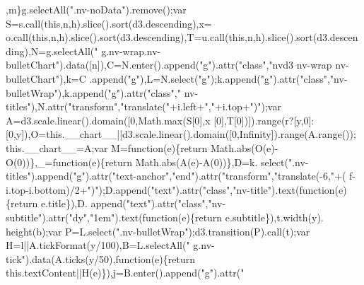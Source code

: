 \begin{DoxyCode}
      ,m\}g.selectAll(\textcolor{stringliteral}{".nv-noData"}).remove();var S=s.call(\textcolor{keyword}{this},n,h).slice().sort(d3.descending),x=
      o.call(\textcolor{keyword}{this},n,h).slice().sort(d3.descending),T=u.call(\textcolor{keyword}{this},n,h).slice().sort(d3.descending),N=g.selectAll(\textcolor{stringliteral}{"
      g.nv-wrap.nv-bulletChart"}).data([n]),C=N.enter().append(\textcolor{stringliteral}{"g"}).attr(\textcolor{stringliteral}{"class"},\textcolor{stringliteral}{"nvd3 nv-wrap nv-bulletChart"}),k=C
      .append(\textcolor{stringliteral}{"g"}),L=N.select(\textcolor{stringliteral}{"g"});k.append(\textcolor{stringliteral}{"g"}).attr(\textcolor{stringliteral}{"class"},\textcolor{stringliteral}{"nv-bulletWrap"}),k.append(\textcolor{stringliteral}{"g"}).attr(\textcolor{stringliteral}{"class"},\textcolor{stringliteral}{"
      nv-titles"}),N.attr(\textcolor{stringliteral}{"transform"},\textcolor{stringliteral}{"translate("}+i.left+\textcolor{stringliteral}{","}+i.top+\textcolor{stringliteral}{")"});var A=d3.scale.linear().domain([0,Math.max(S[0],x
      [0],T[0])]).range(r?[y,0]:[0,y]),O=this.\_\_chart\_\_||d3.scale.linear().domain([0,Infinity]).range(A.range());
      this.\_\_chart\_\_=A;var M=\textcolor{keyword}{function}(e)\{\textcolor{keywordflow}{return} Math.abs(O(e)-O(0))\},\_=\textcolor{keyword}{function}(e)\{\textcolor{keywordflow}{return} Math.abs(A(e)-A(0))\},D=k.
      select(\textcolor{stringliteral}{".nv-titles"}).append(\textcolor{stringliteral}{"g"}).attr(\textcolor{stringliteral}{"text-anchor"},\textcolor{stringliteral}{"end"}).attr(\textcolor{stringliteral}{"transform"},\textcolor{stringliteral}{"translate(-6,"}+(
      f-i.top-i.bottom)/2+\textcolor{stringliteral}{")"});D.append(\textcolor{stringliteral}{"text"}).attr(\textcolor{stringliteral}{"class"},\textcolor{stringliteral}{"nv-title"}).text(\textcolor{keyword}{function}(e)\{\textcolor{keywordflow}{return} e.title\}),D.
      append(\textcolor{stringliteral}{"text"}).attr(\textcolor{stringliteral}{"class"},\textcolor{stringliteral}{"nv-subtitle"}).attr(\textcolor{stringliteral}{"dy"},\textcolor{stringliteral}{"1em"}).text(\textcolor{keyword}{function}(e)\{\textcolor{keywordflow}{return} e.subtitle\}),t.width(y).
      height(b);var P=L.select(\textcolor{stringliteral}{".nv-bulletWrap"});d3.transition(P).call(t);var H=l||A.tickFormat(y/100),B=L.selectAll(\textcolor{stringliteral}{"
      g.nv-tick"}).data(A.ticks(y/50),\textcolor{keyword}{function}(e)\{\textcolor{keywordflow}{return} this.textContent||H(e)\}),j=B.enter().append(\textcolor{stringliteral}{"g"}).attr(\textcolor{stringliteral}{"
}
\end{DoxyCode}
